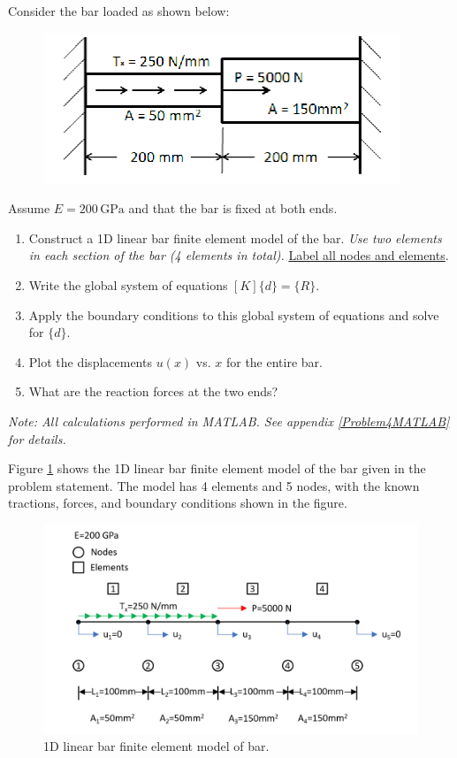 \documentclass[../main.tex]{subfiles}
\begin{document}

Consider the bar loaded as shown below:

\begin{figure}[h!]
    \centering
    \includegraphics[scale=0.9]{../../images/problem_5/setup}
\end{figure}

Assume \(E=200\,\unit{\giga\pascal}\) and that the bar is fixed at both ends.

\begin{enumerate}[label=\alph*)]
    \item Construct a 1D linear bar finite element model of the bar. \textit{Use two elements in each section of the bar (4 elements in total).} \underline{Label all nodes and elements}.
    \item Write the global system of equations \([K]\{d\} = \{R\}\).
    \item Apply the boundary conditions to this global system of equations and solve for \(\{d\}\).
    \item Plot the displacements \(u(x)\) vs. \(x\) for the entire bar.
    \item What are the reaction forces at the two ends?
\end{enumerate}

\textit{Note: All calculations performed in MATLAB. See appendix \ref{Problem4MATLAB} for details.}


Figure \ref{fea_bar} shows the 1D linear bar finite element model of the bar given in the problem statement.
The model has 4 elements and 5 nodes, with the known tractions, forces, and boundary conditions shown in the figure.

\begin{figure}[h!]
    \centering
    \includegraphics[scale=0.45]{../../images/problem_5/5elementbar.png}
    \caption{1D linear bar finite element model of bar.}
    \label{fea_bar}
\end{figure}
\end{document}
